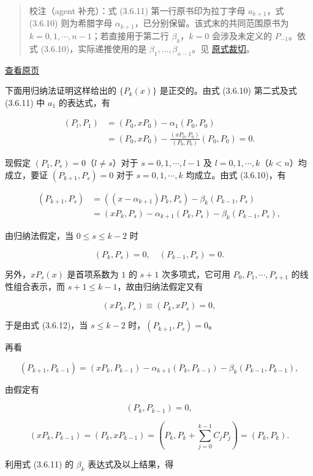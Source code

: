\documentclass[
  10pt,
  fontset=fandol]{ctexart}
\begin{document}
\begin{quote}
校注（agent 补充）：式 (3.6.11) 第一行原书印为拉丁字母 \(a_{k+1}\)，式 (3.6.10) 则为希腊字母 \(\alpha_{k+1}\)，已分别保留。该式末的共同范围原书为 \(k=0,1,\cdots,n-1\)；若直接用于第二行 \(\beta_k\)，\(k=0\) 会涉及未定义的 \(P_{-1}\)。依式 (3.6.10)，实际递推使用的是 \(\beta_1,\ldots,\beta_{n-1}\)。见 \href{../assets/ch03b/p082-recursion-coefficients.png}{原式裁切}。
\end{quote}

\href{../../source-images/pdf-083.jpeg}{查看原页}

下面用归纳法证明这样给出的 \(\{P_k(x)\}\) 是正交的。由式 (3.6.10) 第二式及式 (3.6.11) 中 \(a_1\) 的表达式，有

\[
\begin{aligned}
(P_l,P_1)&=(P_0,xP_0)-\alpha_1(P_0,P_0)\\
&=(P_0,xP_0)-\frac{(xP_0,P_0)}{(P_0,P_0)}(P_0,P_0)=0.
\end{aligned}
\]

现假定 \((P_1,P_s)=0\)（\(l\ne s\)）对于 \(s=0,1,\cdots,l-1\) 及 \(l=0,1,\cdots,k\)（\(k<n\)）均成立，要证 \((P_{k+1},P_s)=0\) 对于 \(s=0,1,\cdots,k\) 均成立。由式 (3.6.10)，有

\[
\begin{aligned}
(P_{k+1},P_s)&=((x-\alpha_{k+1})P_k,P_s)-\beta_k(P_{k-1},P_s)\\
&=(xP_k,P_s)-\alpha_{k+1}(P_k,P_s)-\beta_k(P_{k-1},P_s),
\end{aligned}\tag{3.6.12}
\]

由归纳法假定，当 \(0\leqslant s\leqslant k-2\) 时

\[
(P_k,P_s)=0,\quad(P_{k-1},P_s)=0.
\]

另外，\(xP_s(x)\) 是首项系数为 \(1\) 的 \(s+1\) 次多项式，它可用 \(P_0,P_1,\cdots,P_{s+1}\) 的线性组合表示，而 \(s+1\leqslant k-1\)，故由归纳法假定又有

\[
(xP_k,P_s)\equiv(P_k,xP_s)=0,
\]

于是由式 (3.6.12)，当 \(s\leqslant k-2\) 时，\((P_{k+1},P_s)=0\)。

再看

\[
(P_{k+1},P_{k-1})=(xP_k,P_{k-1})-\alpha_{k+1}(P_k,P_{k-1})-\beta_k(P_{k-1},P_{k-1}),\tag{3.6.13}
\]

由假定有

\[
(P_k,P_{k-1})=0,
\]

\[
(xP_k,P_{k-1})=(P_k,xP_{k-1})=\left(P_k,P_k+\sum_{j=0}^{k-1}C_jP_j\right)=(P_k,P_k).
\]

利用式 (3.6.11) 的 \(\beta_k\) 表达式及以上结果，得
\end{document}
